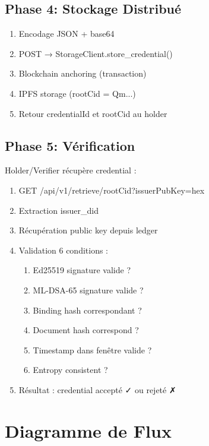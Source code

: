 \documentclass[12pt,a4paper]{report}
\begin{document}
\subsection{Phase 4: Stockage Distribué}

\begin{enumerate}
  \item Encodage JSON + base64
  \item POST → StorageClient.store\_credential()
  \item Blockchain anchoring (transaction)
  \item IPFS storage (rootCid = Qm...)
  \item Retour credentialId et rootCid au holder
\end{enumerate}

\subsection{Phase 5: Vérification}

Holder/Verifier récupère credential :

\begin{enumerate}
  \item GET /api/v1/retrieve/{rootCid}?issuerPubKey={hex}
  \item Extraction issuer\_did
  \item Récupération public key depuis ledger
  \item Validation 6 conditions :
  \begin{enumerate}
    \item Ed25519 signature valide ?
    \item ML-DSA-65 signature valide ?
    \item Binding hash correspondant ?
    \item Document hash correspond ?
    \item Timestamp dans fenêtre valide ?
    \item Entropy consistent ?
  \end{enumerate}
  \item Résultat : credential accepté ✓ ou rejeté ✗
\end{enumerate}

\section{Diagramme de Flux}
\end{document}
